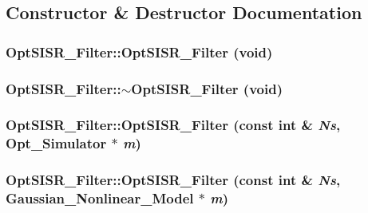 \subsection{Constructor \& Destructor Documentation}
\hypertarget{class_opt_s_i_s_r___filter_482407cf2c2f3d45c5a6f23dbda74355}{
\subsubsection[{OptSISR\_\-Filter}]{\setlength{\rightskip}{0pt plus 5cm}OptSISR\_\-Filter::OptSISR\_\-Filter (void)}}
\label{class_opt_s_i_s_r___filter_482407cf2c2f3d45c5a6f23dbda74355}


\hypertarget{class_opt_s_i_s_r___filter_55a22ba93049dc37183018a4078feecc}{
\subsubsection[{$\sim$OptSISR\_\-Filter}]{\setlength{\rightskip}{0pt plus 5cm}OptSISR\_\-Filter::$\sim$OptSISR\_\-Filter (void)}}
\label{class_opt_s_i_s_r___filter_55a22ba93049dc37183018a4078feecc}


\hypertarget{class_opt_s_i_s_r___filter_a9517303eb49bf062adacbbe4b6a3507}{
\subsubsection[{OptSISR\_\-Filter}]{\setlength{\rightskip}{0pt plus 5cm}OptSISR\_\-Filter::OptSISR\_\-Filter (const int \& {\em Ns}, \/  {\bf Opt\_\-Simulator} $\ast$ {\em m})}}
\label{class_opt_s_i_s_r___filter_a9517303eb49bf062adacbbe4b6a3507}


\hypertarget{class_opt_s_i_s_r___filter_3c6657eab5ca02bbe6aff027b567afa8}{
\subsubsection[{OptSISR\_\-Filter}]{\setlength{\rightskip}{0pt plus 5cm}OptSISR\_\-Filter::OptSISR\_\-Filter (const int \& {\em Ns}, \/  {\bf Gaussian\_\-Nonlinear\_\-Model} $\ast$ {\em m})}}
\label{class_opt_s_i_s_r___filter_3c6657eab5ca02bbe6aff027b567afa8}




